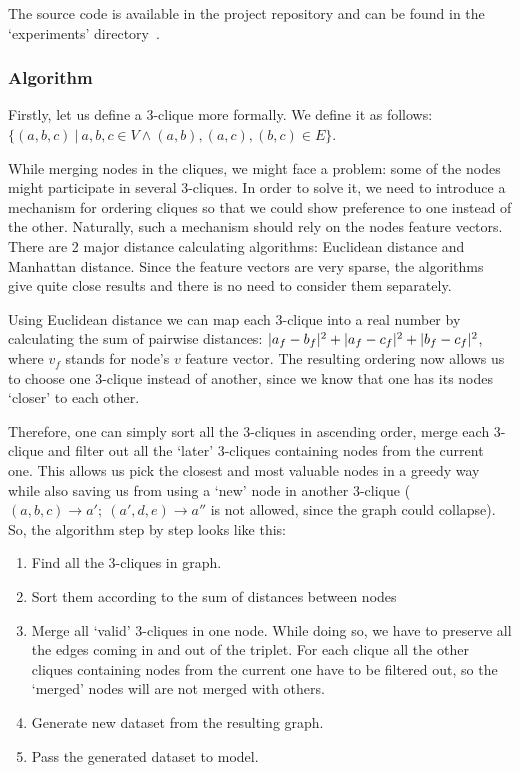 The source code is available in the project repository and can be found in the `experiments' directory~\cite{3clique_ins_experiment}.

\subsubsection*{Algorithm}

Firstly, let us define a 3-clique more formally.
We define it as follows: $
	\{ \left(a, b, c\right)\
	\lvert\ a, b, c \in V \wedge
	\left(a, b\right),
	\left(a, c\right),
	\left(b, c\right) \in E \} $.

While merging nodes in the cliques, we might face a problem: some of the nodes might participate in several 3-cliques.
In order to solve it, we need to introduce a mechanism for ordering cliques so that we could show preference to one instead of the other.
Naturally, such a mechanism should rely on the nodes feature vectors.
There are 2 major distance calculating algorithms: Euclidean distance and Manhattan distance.
Since the feature vectors are very sparse, the algorithms give quite close results and there is no need to consider them separately.

Using Euclidean distance we can map each 3-clique into a real number by calculating the sum of pairwise distances: $\lvert a_f - b_f \rvert^2 + \lvert a_f - c_f \rvert^2 + \lvert b_f - c_f \rvert^2$, where $v_f$ stands for node's $v$ feature vector.
The resulting ordering now allows us to choose one 3-clique instead of another, since we know that one has its nodes `closer' to each other.

Therefore, one can simply sort all the 3-cliques in ascending order, merge each 3-clique and filter out all the `later' 3-cliques containing nodes from the current one.
This allows us pick the closest and most valuable nodes in a greedy way while also saving us from using a `new' node in another 3-clique ($(a, b, c) \rightarrow a';\ (a', d, e) \rightarrow a''$ is not allowed, since the graph could collapse).
So, the algorithm step by step looks like this:
\begin{enumerate}
	\item Find all the 3-cliques in graph.
	\item Sort them according to the sum of distances between nodes
	\item Merge all `valid' 3-cliques in one node. While doing so, we have to preserve all the edges coming in and out of the triplet. For each clique all the other cliques containing nodes from the current one have to be filtered out, so the `merged' nodes will are not merged with others.
	\item Generate new dataset from the resulting graph.
	\item Pass the generated dataset to model.
\end{enumerate}

